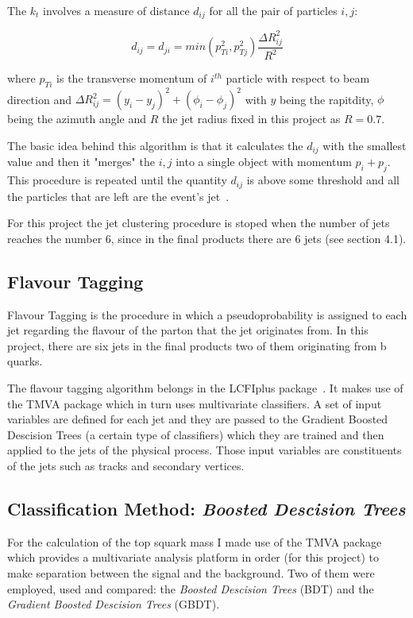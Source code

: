 \documentclass[12pt,a4paper]{report}
\begin{document}
The $k_{t}$ involves a measure of distance $d_{ij}$ for all the pair of particles $i,j$:

\begin{equation}
 d_{ij}=d_{ji}=min(p_{Ti}^{2},p_{Tj}^{2})\frac{\Delta R^{2}_{ij}}{R^{2}}
\end{equation}


where $p_{Ti}$ is the transverse momentum of $i^{th}$ particle with respect to beam direction and 
$\Delta R^{2}_{ij}=(y_{i}-y_{j})^{2}+(\phi_{i}-\phi_{j})^{2}$ with $y$ being the rapitdity, $\phi$ being
the azimuth angle and $R$ the jet radius fixed in this project as $R=0.7$.

The basic idea behind this algorithm is that it calculates the $d_{ij}$ with the smallest value and then it 
"merges" the $i,j$ into a single object with momentum $p_{i}+p_{j}$. This procedure is repeated until the quantity
$d_{ij}$ is above some threshold and all the particles that are left are the event's jet~\cite{cacciari2012fastjet}.

For this project the jet clustering procedure is stoped when the number of jets reaches the number 
6, since in the final products there are 6 jets (see section 4.1).
\subsection{Flavour Tagging}

Flavour Tagging is the procedure in which a pseudoprobability is assigned to each jet regarding the
flavour of the parton
that the jet originates from. In this project, there are six jets in the final products two of them 
originating from b quarks. 

The flavour tagging algorithm belongs in the LCFIplus package~\cite{suehara2016lcfiplus}.
It  makes use of the TMVA package which in turn uses multivariate classifiers. A set of input variables are 
defined for each jet and they are passed to the Gradient Boosted Descision Trees (a certain type of classifiers)
which they are trained and then applied to the jets of the physical process. Those input variables are
constituents of the jets such as tracks and secondary vertices.

\subsection{Classification Method: \textit{Boosted Descision Trees}}

For the calculation of the top squark mass I made use of the TMVA package which provides a multivariate 
analysis platform in order (for this project) to make separation between the signal and the background. Two 
of them were employed, used and compared: the \textit{Boosted Descision Trees} (BDT) and the 
\textit{Gradient Boosted Descision Trees} (GBDT).
\end{document}
